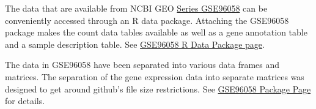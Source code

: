 \documentclass[
]{book}
\newenvironment{Shaded}{\begin{snugshade}}{\end{snugshade}}
\newcommand{\CommentTok}[1]{\textcolor[rgb]{0.56,0.35,0.01}{\textit{#1}}}
\newcommand{\ControlFlowTok}[1]{\textcolor[rgb]{0.13,0.29,0.53}{\textbf{#1}}}
\newcommand{\DataTypeTok}[1]{\textcolor[rgb]{0.13,0.29,0.53}{#1}}
\newcommand{\KeywordTok}[1]{\textcolor[rgb]{0.13,0.29,0.53}{\textbf{#1}}}
\newcommand{\NormalTok}[1]{#1}
\newcommand{\OperatorTok}[1]{\textcolor[rgb]{0.81,0.36,0.00}{\textbf{#1}}}
\newcommand{\OtherTok}[1]{\textcolor[rgb]{0.56,0.35,0.01}{#1}}
\newcommand{\StringTok}[1]{\textcolor[rgb]{0.31,0.60,0.02}{#1}}
\begin{document}
The data that are available from NCBI GEO
\href{https://www.ncbi.nlm.nih.gov/geo/query/acc.cgi?acc=GSE96058}{Series GSE96058}
can be conveniently accessed through an R data package.
Attaching the GSE96058 package makes the count data tables
available as well as a gene annotation table and a sample description table.
See \href{https://12379monty.github.io/GSE96058/}{GSE96058 R Data Package page}.

The data in GSE96058 have been separated into various data frames and
matrices. The separation of the gene expression data into separate matrices
was designed to get around github's file size restrictions. See
\href{https://github.com/12379Monty/GSE96058}{GSE96058 Package Page}
for details.

\begin{Shaded}
\end{Shaded}
\end{document}
